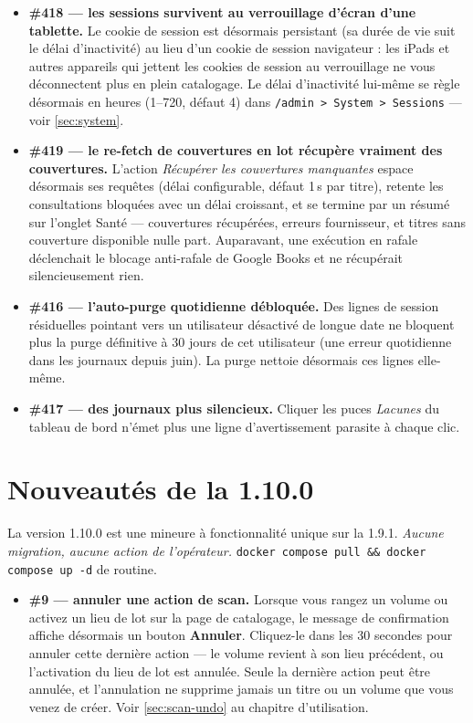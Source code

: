 \begin{itemize}
  \item \textbf{\#418 \string— les sessions survivent au verrouillage
        d'écran d'une tablette.} Le cookie de session est désormais
        persistant (sa durée de vie suit le délai d'inactivité) au lieu
        d'un cookie de session navigateur : les iPads et autres
        appareils qui jettent les cookies de session au verrouillage ne
        vous déconnectent plus en plein catalogage. Le délai
        d'inactivité lui-même se règle désormais en heures (1--720,
        défaut 4) dans \texttt{/admin > System > Sessions} — voir
        \autoref{sec:system}.
  \item \textbf{\#419 \string— le re-fetch de couvertures en lot
        récupère vraiment des couvertures.} L'action \emph{Récupérer
        les couvertures manquantes} espace désormais ses requêtes
        (délai configurable, défaut 1\,s par titre), retente les
        consultations bloquées avec un délai croissant, et se termine
        par un résumé sur l'onglet Santé — couvertures récupérées,
        erreurs fournisseur, et titres sans couverture disponible nulle
        part. Auparavant, une exécution en rafale déclenchait le
        blocage anti-rafale de Google Books et ne récupérait
        silencieusement rien.
  \item \textbf{\#416 \string— l'auto-purge quotidienne débloquée.}
        Des lignes de session résiduelles pointant vers un utilisateur
        désactivé de longue date ne bloquent plus la purge définitive à
        30 jours de cet utilisateur (une erreur quotidienne dans les
        journaux depuis juin). La purge nettoie désormais ces lignes
        elle-même.
  \item \textbf{\#417 \string— des journaux plus silencieux.} Cliquer
        les puces \emph{Lacunes} du tableau de bord n'émet plus une
        ligne d'avertissement parasite à chaque clic.
\end{itemize}

\section{Nouveautés de la 1.10.0}\label{sec:whats-new-1.10.0}

La version 1.10.0 est une mineure à fonctionnalité unique sur la
1.9.1. \emph{Aucune migration, aucune action de l'opérateur.}
\texttt{docker compose pull \&\& docker compose up -d} de routine.

\begin{itemize}
  \item \textbf{\#9 \string— annuler une action de scan.} Lorsque
        vous rangez un volume ou activez un lieu de lot sur la page de
        catalogage, le message de confirmation affiche désormais un
        bouton \textbf{Annuler}. Cliquez-le dans les 30 secondes pour
        annuler cette dernière action — le volume revient à son lieu
        précédent, ou l'activation du lieu de lot est annulée. Seule
        la dernière action peut être annulée, et l'annulation ne
        supprime jamais un titre ou un volume que vous venez de
        créer. Voir \autoref{sec:scan-undo} au chapitre d'utilisation.
\end{itemize}

